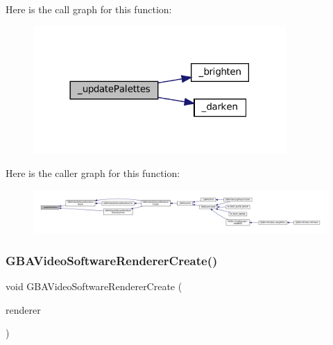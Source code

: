 Here is the call graph for this function\+:
\nopagebreak
\begin{figure}[H]
\begin{center}
\leavevmode
\includegraphics[width=273pt]{video-software_8c_afacc87d619eca46b04d8996790e302ef_cgraph}
\end{center}
\end{figure}
Here is the caller graph for this function\+:
\nopagebreak
\begin{figure}[H]
\begin{center}
\leavevmode
\includegraphics[width=350pt]{video-software_8c_afacc87d619eca46b04d8996790e302ef_icgraph}
\end{center}
\end{figure}
\mbox{\label{video-software_8c_ac2fa4723211d9affabf42dafa0dc56c1}} 
\subsubsection{\texorpdfstring{G\+B\+A\+Video\+Software\+Renderer\+Create()}{GBAVideoSoftwareRendererCreate()}}
{\footnotesize\ttfamily void G\+B\+A\+Video\+Software\+Renderer\+Create (\begin{DoxyParamCaption}\item[{struct G\+B\+A\+Video\+Software\+Renderer $\ast$}]{renderer }\end{DoxyParamCaption})}

